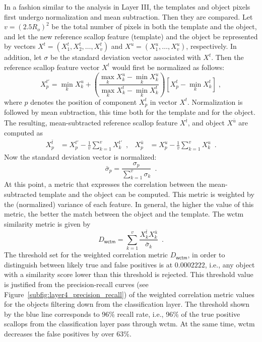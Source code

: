 \documentclass {udthesis}
\begin{document}
In a fashion similar to the analysis in Layer III, the templates and object pixels first undergo normalization and mean subtraction.
Then they are compared.
Let $v=(2.5R_o)^2$ be the total number of pixels in both the template and the object, and let the new reference scallop feature (template) and the object be represented by vectors $X^t=(X^t_1,X^t_2, \ldots,X^t_{v})$ and $X^u=(X^u_1,\ldots,X^u_{v})$, respectively. 
In addition, let $\sigma$ be the standard deviation vector associated with $X^t$.
Then the reference scallop feature vector $X^t$ would first be normalized as follows: 
%
\[
X^{t'}_p = \min_{k} X^u_k + \left(\frac{\max \limits_{k} X^u_k-\min \limits_{k} X^u_k}{\max \limits_{k} X^{t}_k-\min \limits _{k} X^{t}_k}
\right)\left[ X^{t}_p-\min_{k} X^{t}_k \right] \; ,
\]
%
where $p$ denotes the position of component $X^t_p$ in vector $X^t$.
Normalization is followed by mean subtraction, this time both for the template and for the object. 
The resulting, mean-subtracted reference scallop feature $X^{\bar{t}}$, and object $X^{\bar{u}}$ are computed as
%
\begin{align*}
X^{\bar{t}}_p &= X^{t'}_p-\frac{1}{v}\sum_{k=1}^{v}X^{t'}_k \enspace,& 
X^{\bar{u}}_p &= X^{u}_p-\frac{1}{v}\sum_{k=1}^{v}X^{u}_k \enspace.
\end{align*}
%
Now the standard deviation vector is normalized:
%
\[
\bar{\sigma}_p = \frac{\sigma_p}{\sum_{k=1}^{v}\sigma_k} \enspace.
\]
%
At this point, a metric that expresses the correlation between the mean-subtracted template and the object can be computed.
This metric is weighted by the (normalized) variance of each feature. 
In general, the higher the value of this metric, the better the match between the object and the template. 
The \gls{wctm} similarity metric is given by
%
\[
D_\mathsf{wctm} = \sum_{k=1}^v\frac{X^{\bar{t}}_{k}X^{\bar{u}}_k}{\bar{\sigma}_{k}} \enspace .
\]
%
The threshold set for the weighted correlation metric $D_\mathsf{wctm}$, in order to distinguish between likely true and false positives is at $0.0002222$, i.e., any object with a similarity score lower than this threshold is rejected. 
This threshold value is justified from the precision-recall curves (see Figure~\ref{subfig:layer4_precision_recall}) of the weighted correlation metric values for the objects filtering down from the classification layer. 
The threshold shown by the blue line corresponds to 96\% recall rate, i.e., 96\% of the true positive scallops from the classification layer pass through \gls{wctm}. 
At the same time, \gls{wctm} decreases the false positives by over 63\%.
\end{document}
